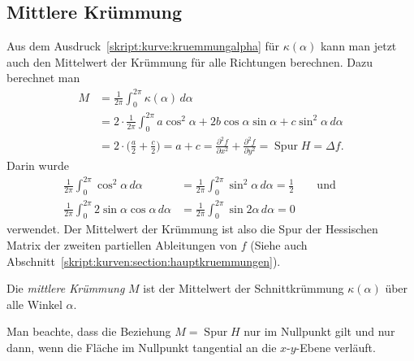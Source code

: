 \subsection{Mittlere Krümmung%
\label{skript:kurve:mittlerekruemmung}}
Aus dem Ausdruck~\eqref{skript:kurve:kruemmungalpha}
für $\kappa(\alpha)$ kann man jetzt auch den Mittelwert
der Krümmung für alle Richtungen berechnen.
Dazu berechnet man
\begin{align*}
M
&=
\frac{1}{2\pi}\int_0^{2\pi} \kappa(\alpha)\,d\alpha
\\
&=
2\cdot
\frac{1}{2\pi}\int_0^{2\pi}
a\cos^2\alpha + 2b\cos\alpha\sin\alpha + c\sin^2 \alpha
\,d\alpha
\\
&=
2\cdot\biggl( \frac{a}2 + \frac{c}2\biggr)
=
a+c
=
\frac{\partial^2 f}{\partial x^2}
+
\frac{\partial^2 f}{\partial y^2}
=
\operatorname{Spur}H
=
\Delta f.
\end{align*}
Darin wurde
\begin{align*}
\frac1{2\pi}\int_0^{2\pi}\cos^2\alpha\,d\alpha
&=
\frac1{2\pi}\int_0^{2\pi}\sin^2\alpha\,d\alpha
=
\frac12
\qquad\text{und}\qquad
\\
\frac{1}{2\pi}\int_0^{2\pi}2\sin\alpha\cos\alpha\,d\alpha
&=
\frac{1}{2\pi}\int_0^{2\pi}\sin2\alpha\,d\alpha
=
0
\end{align*}
verwendet.
Der Mittelwert der Krümmung ist also die Spur der Hessischen Matrix
der zweiten partiellen Ableitungen von $f$
(Siehe auch Abschnitt~\ref{skript:kurven:section:hauptkruemmungen}).

\begin{definition}
\label{skript:definition:mittlerekruemmung}
Die {\em mittlere Krümmung} $M$ ist der Mittelwert der Schnittkrümmung
$\kappa(\alpha)$ über alle Winkel $\alpha$.
\end{definition}

Man beachte, dass die Beziehung $M=\operatorname{Spur}H$ nur 
im Nullpunkt gilt und nur dann, wenn die Fläche im Nullpunkt tangential
an die $x$-$y$-Ebene verläuft.




